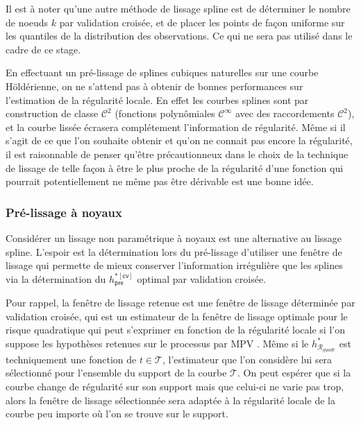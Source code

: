 Il est à noter qu'une autre méthode de lissage spline est de déterminer le nombre de noeuds $k$ par validation croisée, et de placer les points de façon uniforme sur les quantiles de la distribution des observations. Ce qui ne sera pas utilisé dans le cadre de ce stage.

\bigskip

En effectuant un pré-lissage de splines cubiques naturelles sur une courbe Höldérienne, on ne s'attend pas à obtenir de bonnes performances sur l'estimation de la régularité locale. En effet les courbes splines sont par construction de classe $\mathcal C^2$ (fonctions polynômiales $\mathcal C ^\infty$ avec des raccordements $\mathcal C^2$), et la courbe lissée écrasera complétement l'information de régularité. Même si il s'agit de ce que l'on souhaite obtenir et qu'on ne connait pas encore la régularité, il est raisonnable de penser qu'être précautionneux dans le choix de la technique de lissage de telle façon à être le plus proche de la régularité d'une fonction qui pourrait potentiellement ne même pas être dérivable est une bonne idée.



\subsubsection{Pré-lissage à noyaux}

Considérer un lissage non paramétrique à noyaux est une alternative au lissage spline. L'espoir est la détermination lors du pré-lissage d'utiliser une fenêtre de lissage qui permette de mieux conserver l'information irrégulière que les splines via la détermination du $h^{*[\textsf{cv}]}_{\textsf{pre}}$ optimal par validation croisée.

\bigskip

Pour rappel, la fenêtre de lissage retenue est une fenêtre de lissage déterminée par validation croisée, qui est un estimateur de la fenêtre de lissage optimale pour le risque quadratique qui peut s'exprimer en fonction de la régularité locale si l'on suppose les hypothèses retenues sur le processus par MPV \cite{maissoro-SmoothnessFTSweakDep}. Même si le $h^*_{\mathcal R_{quadr}}$ est techniquement une fonction de $t \in \mathcal T$, l'estimateur que l'on considère lui sera sélectionné pour l'ensemble du support de la courbe $\mathcal T$. On peut espérer que si la courbe change de régularité sur son support mais que celui-ci ne varie pas trop, alors la fenêtre de lissage sélectionnée sera adaptée à la régularité locale de la courbe peu importe où l'on se trouve sur le support.


